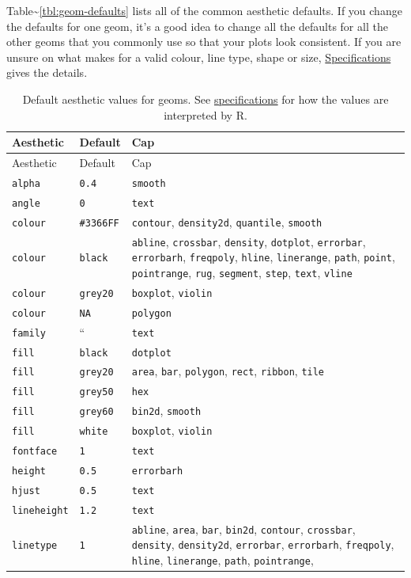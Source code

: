 Table\textasciitilde{}\ref{tbl:geom-defaults} lists all of the common
aesthetic defaults. If you change the defaults for one geom, it's a good
idea to change all the defaults for all the other geoms that you
commonly use so that your plots look consistent. If you are unsure on
what makes for a valid colour, line type, shape or size,
\hyperref[cha:specifications]{Specifications} gives the details.

\begin{longtable}[c]{@{}lll@{}}
\caption{Default aesthetic values for geoms. See
\hyperref[cha:specifications]{specifications} for how the values are
interpreted by R.}\tabularnewline
\toprule
Aesthetic & Default & Cap\tabularnewline
\midrule
\endfirsthead
\toprule
Aesthetic & Default & Cap\tabularnewline
\midrule
\endhead
\texttt{alpha} & \texttt{0.4} & \texttt{smooth}\tabularnewline
\texttt{angle} & \texttt{0} & \texttt{text}\tabularnewline
\texttt{colour} & \texttt{\#3366FF} & \texttt{contour},
\texttt{density2d}, \texttt{quantile}, \texttt{smooth}\tabularnewline
\texttt{colour} & \texttt{black} & \texttt{abline}, \texttt{crossbar},
\texttt{density}, \texttt{dotplot}, \texttt{errorbar},
\texttt{errorbarh}, \texttt{freqpoly}, \texttt{hline},
\texttt{linerange}, \texttt{path}, \texttt{point}, \texttt{pointrange},
\texttt{rug}, \texttt{segment}, \texttt{step}, \texttt{text},
\texttt{vline}\tabularnewline
\texttt{colour} & \texttt{grey20} & \texttt{boxplot},
\texttt{violin}\tabularnewline
\texttt{colour} & \texttt{NA} & \texttt{polygon}\tabularnewline
\texttt{family} & `` & \texttt{text}\tabularnewline
\texttt{fill} & \texttt{black} & \texttt{dotplot}\tabularnewline
\texttt{fill} & \texttt{grey20} & \texttt{area}, \texttt{bar},
\texttt{polygon}, \texttt{rect}, \texttt{ribbon},
\texttt{tile}\tabularnewline
\texttt{fill} & \texttt{grey50} & \texttt{hex}\tabularnewline
\texttt{fill} & \texttt{grey60} & \texttt{bin2d},
\texttt{smooth}\tabularnewline
\texttt{fill} & \texttt{white} & \texttt{boxplot},
\texttt{violin}\tabularnewline
\texttt{fontface} & \texttt{1} & \texttt{text}\tabularnewline
\texttt{height} & \texttt{0.5} & \texttt{errorbarh}\tabularnewline
\texttt{hjust} & \texttt{0.5} & \texttt{text}\tabularnewline
\texttt{lineheight} & \texttt{1.2} & \texttt{text}\tabularnewline
\texttt{linetype} & \texttt{1} & \texttt{abline}, \texttt{area},
\texttt{bar}, \texttt{bin2d}, \texttt{contour}, \texttt{crossbar},
\texttt{density}, \texttt{density2d}, \texttt{errorbar},
\texttt{errorbarh}, \texttt{freqpoly}, \texttt{hline},
\texttt{linerange}, \texttt{path}, \texttt{pointrange},

\end{longtable}
